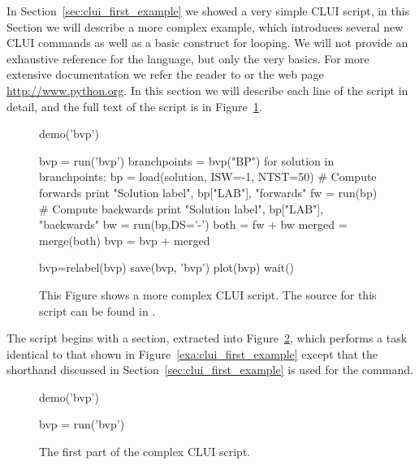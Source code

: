 \documentclass[12pt]{report}
\begin{document}
 In Section~\ref{sec:clui_first_example} we showed a very simple
 \AUTO CLUI script, in this Section we will describe a more
 complex example, which introduces several new \AUTO CLUI
 commands as well as a basic \python construct for looping.
 We will not provide an exhaustive reference for
 the \python language, but only 
 the very basics.  For more extensive documentation we refer the
 reader to  \citeyear{Lut:96} or the
 web page \url{http://www.python.org}.
 In this section we will describe each line of the script
 in detail, and the full text of the script is in
 Figure~\ref{exa:clui_complex_script}.

 \begin{figure}[htbp]
 {\small \begin{center} \begin{boxedverbatim}
 demo('bvp')

 bvp = run('bvp')
 branchpoints = bvp("BP")
 for solution in branchpoints:
     bp = load(solution, ISW=-1, NTST=50)
     # Compute forwards
     print "Solution label", bp["LAB"], "forwards"
     fw = run(bp)
     # Compute backwards
     print "Solution label", bp["LAB"], "backwards"
     bw = run(bp,DS='-')
     both = fw + bw
     merged = merge(both)
     bvp = bvp + merged

 bvp=relabel(bvp)
 save(bvp, 'bvp')
 plot(bvp)
 wait()
 \end{boxedverbatim}
 \end{center} 
 }
 \caption[A complex example of a \AUTO CLUI script.]
 {This Figure shows a more complex \AUTO CLUI script.
 The source for this script can be found in .
 }
 \label{exa:clui_complex_script}
 \end{figure}

 The script begins with a section, extracted into 
 Figure~\ref{exa:clui_complex_first}, which performs a task 
 identical to that shown in Figure~\ref{exa:clui_first_example}
 except that the shorthand discussed in 
 Section~\ref{sec:clui_first_example} is used for the 
  command.

 \begin{figure}[htbp]
 {\small \begin{center} \begin{boxedverbatim}
 demo('bvp')

 bvp = run('bvp')
 \end{boxedverbatim}
 \end{center} 
 }
 \caption[The first part of the  complex \AUTO CLUI script.]
 {The first part of the  complex \AUTO CLUI script.}
 \label{exa:clui_complex_first}
 \end{figure}
\end{document}
